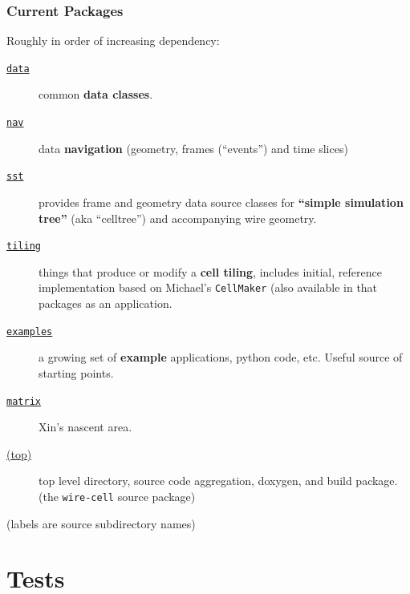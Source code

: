 \documentclass[xcolor=dvipsnames]{beamer}
\begin{document}
\begin{frame}
  \frametitle{Current Packages}
  \footnotesize
  Roughly in order of increasing dependency:
  \begin{description}
  \item[\href{https://github.com/BNLIF/wire-cell-data}{\texttt{data}}]
    common \textbf{data classes}.
  \item[\href{https://github.com/BNLIF/wire-cell-nav}{\texttt{nav}}]
    data \textbf{navigation} (geometry, frames (``events'') and time slices)
  \item[\href{https://github.com/BNLIF/wire-cell-sst}{\texttt{sst}}]
    provides frame and geometry data source classes for \textbf{``simple
    simulation tree''} (aka ``celltree'') and accompanying wire
    geometry.
  \item[\href{https://github.com/BNLIF/wire-cell-tiling}{\texttt{tiling}}]
    things that produce or modify a \textbf{cell tiling}, includes 
    initial, reference implementation based on
    Michael's \texttt{CellMaker} (also available in that packages as an application.
  \item[\href{https://github.com/BNLIF/wire-cell-examples}{\texttt{examples}}]
    a growing set of \textbf{example} applications, python code, etc.
    Useful source of starting points.
  \item[\href{https://github.com/BNLIF/wire-cell-matrix}{\texttt{matrix}}]
    Xin's nascent area.    
  \item[\href{https://github.com/BNLIF/wire-cell}{(top)}] top
    level directory, source code aggregation, doxygen, and build
    package.
    (the \texttt{wire-cell} source package)
  \end{description}

  
  (labels are source subdirectory names)
\end{frame}

\section{Tests}

\begin{frame}[fragile]
\end{frame}
\end{document}
